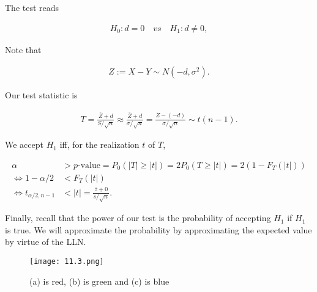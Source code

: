 \begin{solution}

The test reads

\begin{align*}
    H_0: d = 0
    \quad
    \textit{vs}
    \quad
    H_1: d \neq 0,
\end{align*}

Note that

\begin{align*}
    Z := X - Y \sim N(-d, \sigma^2).
\end{align*}

Our test statistic is

\begin{align*}
    T
    =
    \frac{\bar Z + d}{S / \sqrt n}
    \approx
    \frac{\bar Z + d}{\sigma / \sqrt n}
    =
    \frac{\bar Z - (-d)}{\sigma / \sqrt n}
    \sim
    t(n-1).
\end{align*}

We accept $H_1$ iff, for the realization $t$ of $T$,

\begin{align*}
    \alpha
    & >
    \text{$p$-value}
    =
    P_0(|T| \geq |t|)
    =
    2 P_0(T \geq |t|)
    =
    2 (1 - F_T(|t|)) \\
    \iff
    1 - \alpha / 2 & < F_T(|t|) \\
    \iff
    t_{\alpha/2, n-1} & < |t| = \frac{\bar z + 0}{s / \sqrt n}.
\end{align*}

Finally, recall that the power of our test is the probability of accepting $H_1$ if $H_1$ is true.
We will approximate the probability by approximating the expected value by virtue of the LLN.

\begin{figure}[H]
    \centering
    \texttt{[image: 11.3.png]}
    \caption{(a) is red, (b) is green and (c) is blue}
    \label{fig:jojojo}
\end{figure}



\end{solution}


